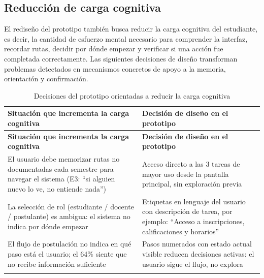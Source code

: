 \subsection{Reducción de carga cognitiva}

El rediseño del prototipo también busca reducir la carga cognitiva del estudiante, es decir, la cantidad de esfuerzo mental necesario para comprender la interfaz, recordar rutas, decidir por dónde empezar y verificar si una acción fue completada correctamente. Las siguientes decisiones de diseño transforman problemas detectados en mecanismos concretos de apoyo a la memoria, orientación y confirmación.

{\small
\setlength{\tabcolsep}{4pt}
\renewcommand{\arraystretch}{1.25}
\begin{longtable}{|p{6.7cm}|p{7cm}|}
\hline
\textbf{Situación que incrementa la carga cognitiva} & \textbf{Decisión de diseño en el prototipo} \\
\hline
\endfirsthead

\hline
\textbf{Situación que incrementa la carga cognitiva} & \textbf{Decisión de diseño en el prototipo} \\
\hline
\endhead

El usuario debe memorizar rutas no documentadas cada semestre para navegar el sistema (E3: ``si alguien nuevo lo ve, no entiende nada'') & Acceso directo a las 3 tareas de mayor uso desde la pantalla principal, sin exploración previa \\
\hline

La selección de rol (estudiante / docente / postulante) es ambigua: el sistema no indica por dónde empezar & Etiquetas en lenguaje del usuario con descripción de tarea, por ejemplo: ``Acceso a inscripciones, calificaciones y horarios'' \\
\hline

El flujo de postulación no indica en qué paso está el usuario; el 64\% siente que no recibe información suficiente & Pasos numerados con estado actual visible reducen decisiones activas: el usuario sigue el flujo, no explora \\
\hline
\caption{Decisiones del prototipo orientadas a reducir la carga cognitiva}\label{tab:reduccion-carga-cognitiva}
\end{longtable}
}
